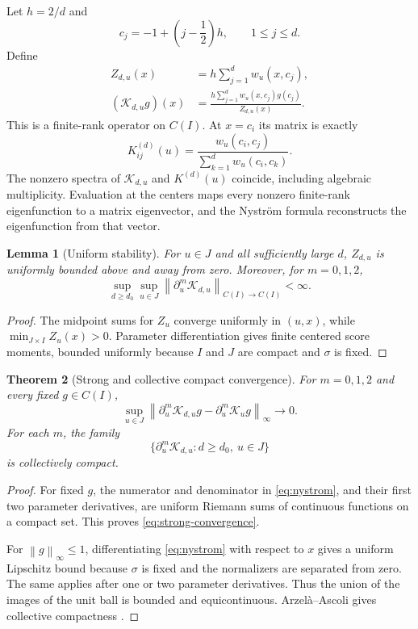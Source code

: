 \documentclass[11pt]{article}
\newtheorem{theorem}{Theorem}[section]
\newtheorem{lemma}[theorem]{Lemma}
\theoremstyle{definition}
\theoremstyle{remark}
\newcommand{\cK}{\mathcal K}
\newcommand{\norm}[1]{\left\lVert #1\right\rVert}
\begin{document}
Let $h=2/d$ and
\[
  c_j=-1+\left(j-\frac12\right)h,\qquad 1\le j\le d.
\]
Define
\begin{align}
  Z_{d,u}(x)&=h\sum_{j=1}^dw_u(x,c_j),\label{eq:discrete-normalizer}\\
  (\cK_{d,u}g)(x)
  &=\frac{h\sum_{j=1}^dw_u(x,c_j)g(c_j)}{Z_{d,u}(x)}.
  \label{eq:nystrom}
\end{align}
This is a finite-rank operator on $C(I)$.  At $x=c_i$ its matrix is exactly
\begin{equation}\label{eq:matrix}
  K_{ij}^{(d)}(u)
  =\frac{w_u(c_i,c_j)}{\sum_{k=1}^dw_u(c_i,c_k)}.
\end{equation}
The nonzero spectra of $\cK_{d,u}$ and $K^{(d)}(u)$ coincide, including
algebraic multiplicity.  Evaluation at the centers maps every nonzero
finite-rank eigenfunction to a matrix eigenvector, and the Nystr\"om formula
reconstructs the eigenfunction from that vector.

\begin{lemma}[Uniform stability]\label{lem:uniform}
For $u\in J$ and all sufficiently large $d$, $Z_{d,u}$ is uniformly bounded
above and away from zero.  Moreover, for $m=0,1,2$,
\[
  \sup_{d\ge d_0}\sup_{u\in J}
  \norm{\partial_u^m\cK_{d,u}}_{C(I)\to C(I)}<\infty.
\]
\end{lemma}

\begin{proof}
The midpoint sums for $Z_u$ converge uniformly in $(u,x)$, while
$\min_{J\times I}Z_u(x)>0$.  Parameter differentiation gives finite
centered score moments, bounded uniformly because $I$ and $J$ are compact
and $\sigma$ is fixed.
\end{proof}

\begin{theorem}[Strong and collective compact convergence]
\label{thm:collective}
For $m=0,1,2$ and every fixed $g\in C(I)$,
\begin{equation}\label{eq:strong-convergence}
  \sup_{u\in J}
  \norm{\partial_u^m\cK_{d,u}g-\partial_u^m\cK_ug}_\infty
  \longrightarrow0.
\end{equation}
For each $m$, the family
\[
  \{\partial_u^m\cK_{d,u}:d\ge d_0,\ u\in J\}
\]
is collectively compact.
\end{theorem}

\begin{proof}
For fixed $g$, the numerator and denominator in \eqref{eq:nystrom}, and their
first two parameter derivatives, are uniform Riemann sums of continuous
functions on a compact set.  This proves \eqref{eq:strong-convergence}.

For $\norm{g}_\infty\le1$, differentiating \eqref{eq:nystrom} with respect to
$x$ gives a uniform Lipschitz bound because $\sigma$ is fixed and the
normalizers are separated from zero.  The same applies after one or two
parameter derivatives.  Thus the union of the images of the unit ball is
bounded and equicontinuous.  Arzel\`a--Ascoli gives collective compactness
\citep{Anselone1971,Atkinson1997}.
\end{proof}
\end{document}
